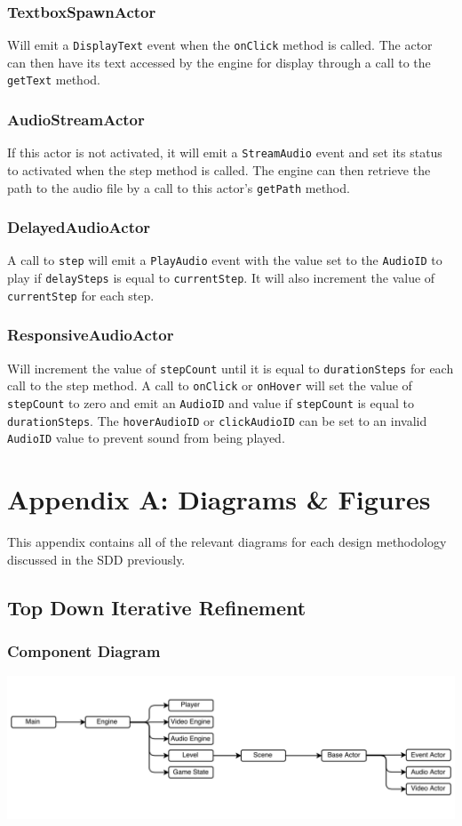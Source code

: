 \documentclass{article}
\begin{document}
    \subsubsection{TextboxSpawnActor}
    Will emit a \texttt{DisplayText} event when the \texttt{onClick} method is called. The actor can then have its text accessed by the engine for display through a call to the \texttt{getText} method.
    \subsubsection{AudioStreamActor}
    If this actor is not activated, it will emit a \texttt{StreamAudio} event and set its status to activated when the step method is called. The engine can then retrieve the path to the audio file by a call to this actor's \texttt{getPath} method.
    \subsubsection{DelayedAudioActor}
    A call to \texttt{step} will emit a \texttt{PlayAudio} event with the value set to the \texttt{AudioID} to play if \texttt{delaySteps} is equal to \texttt{currentStep}. It will also increment the value of \texttt{currentStep} for each step.
    \subsubsection{ResponsiveAudioActor}
    Will increment the value of \texttt{stepCount} until it is equal to \texttt{durationSteps} for each call to the step method. A call to \texttt{onClick} or \texttt{onHover} will set the value of \texttt{stepCount} to zero and emit an \texttt{AudioID} and value if \texttt{stepCount} is equal to \texttt{durationSteps}. The \texttt{hoverAudioID} or \texttt{clickAudioID} can be set to an invalid \texttt{AudioID} value to prevent sound from being played.

%
%
\newpage
\section{Appendix A: Diagrams \& Figures}
	This appendix contains all of the relevant diagrams for each design methodology discussed in the SDD previously.
	\subsection{Top Down Iterative Refinement}
		\subsubsection{Component Diagram}
			\begin{center}
				\includegraphics[scale=0.4,angle=90]{Top_down.png}
			\end{center}
\end{document}
